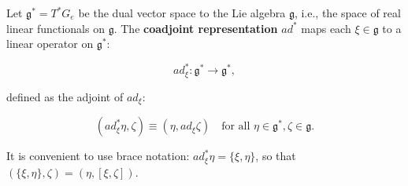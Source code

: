 Let $\mathfrak{g}^* = T^*G_e$ be the dual vector space to the Lie algebra $\mathfrak{g}$, i.e., the space of real linear functionals on $\mathfrak{g}$. The \textbf{coadjoint representation} $ad^*$ maps each $\xi \in \mathfrak{g}$ to a linear operator on $\mathfrak{g}^*$:

$$ad^*_\xi : \mathfrak{g}^* \to \mathfrak{g}^*,$$

defined as the adjoint of $ad_\xi$:

$$(ad^*_\xi \eta, \zeta) \equiv (\eta, ad_\xi \zeta) \quad \text{for all } \eta \in \mathfrak{g}^*, \zeta \in \mathfrak{g}.$$

It is convenient to use brace notation: $ad^*_\xi \eta = \{\xi, \eta\}$, so that $(\{\xi, \eta\}, \zeta) = (\eta, [\xi, \zeta])$.

